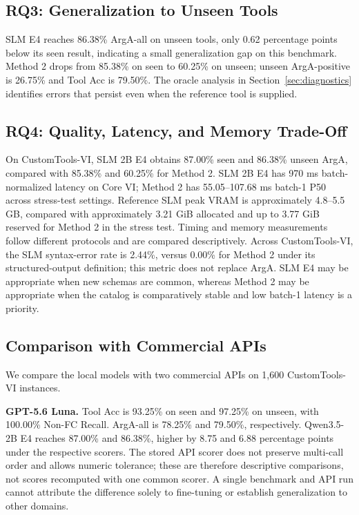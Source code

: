 \documentclass[10pt,twocolumn,a4paper]{article}
\begin{document}
\subsection{RQ3: Generalization to Unseen Tools}
SLM E4 reaches 86.38\% ArgA-all on unseen tools, only 0.62 percentage points below its seen result, indicating a small generalization gap on this benchmark. Method 2 drops from 85.38\% on seen to 60.25\% on unseen; unseen ArgA-positive is 26.75\% and Tool Acc is 79.50\%. The oracle analysis in Section~\ref{sec:diagnostics} identifies errors that persist even when the reference tool is supplied.

\subsection{RQ4: Quality, Latency, and Memory Trade-Off}
On CustomTools-VI, SLM 2B E4 obtains 87.00\% seen and 86.38\% unseen ArgA, compared with 85.38\% and 60.25\% for Method 2. SLM 2B E4 has 970 ms batch-normalized latency on Core VI; Method 2 has 55.05--107.68 ms batch-1 P50 across stress-test settings. Reference SLM peak VRAM is approximately 4.8--5.5 GB, compared with approximately 3.21 GiB allocated and up to 3.77 GiB reserved for Method 2 in the stress test. Timing and memory measurements follow different protocols and are compared descriptively. Across CustomTools-VI, the SLM syntax-error rate is 2.44\%, versus 0.00\% for Method 2 under its structured-output definition; this metric does not replace ArgA. SLM E4 may be appropriate when new schemas are common, whereas Method 2 may be appropriate when the catalog is comparatively stable and low batch-1 latency is a priority.

\subsection{Comparison with Commercial APIs}
We compare the local models with two commercial APIs on 1,600 CustomTools-VI instances.

\textbf{GPT-5.6 Luna.} Tool Acc is 93.25\% on seen and 97.25\% on unseen, with 100.00\% Non-FC Recall. ArgA-all is 78.25\% and 79.50\%, respectively. Qwen3.5-2B E4 reaches 87.00\% and 86.38\%, higher by 8.75 and 6.88 percentage points under the respective scorers. The stored API scorer does not preserve multi-call order and allows numeric tolerance; these are therefore descriptive comparisons, not scores recomputed with one common scorer. A single benchmark and API run cannot attribute the difference solely to fine-tuning or establish generalization to other domains.
\end{document}
